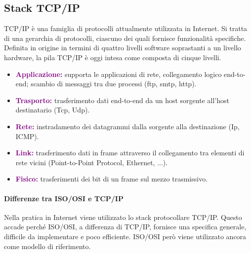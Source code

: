 \subsection{Stack TCP/IP}
TCP/IP è una famiglia di protocolli attualmente utilizzata in Internet. Si tratta di una gerarchia di protocolli, ciascuno dei quali fornisce funzionalità specifiche.
\newline Definita in origine in termini di quattro livelli software soprastanti a un livello hardware, la pila TCP/IP è oggi intesa come composta di cinque livelli.
\begin{itemize}
    \item \textbf{\textcolor{purple}{Applicazione:}} supporta le applicazioni di rete, collegamento logico end-to-end; scambio di messaggi tra due processi (ftp, smtp, http).
    \item \textbf{\textcolor{purple}{Trasporto:}} trasferimento dati end-to-end da un host sorgente all’host destinatario (Tcp, Udp).
    \item \textbf{\textcolor{purple}{Rete:}} instradamento dei datagrammi dalla sorgente alla destinazione (Ip, ICMP).
    \item \textbf{\textcolor{purple}{Link:}} trasferimento dati in frame attraverso il collegamento tra elementi di rete vicini (Point-to-Point Protocol, Ethernet, ...).
    \item \textbf{\textcolor{purple}{Fisico:}} trasferimenti dei bit di un frame sul mezzo trasmissivo.
\end{itemize}

\newpage

\paragraph{Differenze tra ISO/OSI e TCP/IP} Nella pratica in Internet viene utilizzato lo stack protocollare TCP/IP. Questo accade perché ISO/OSI, a differenza di TCP/IP, fornisce una specifica generale, difficile da implementare e poco efficiente. ISO/OSI però viene utilizzato ancora come modello di riferimento.